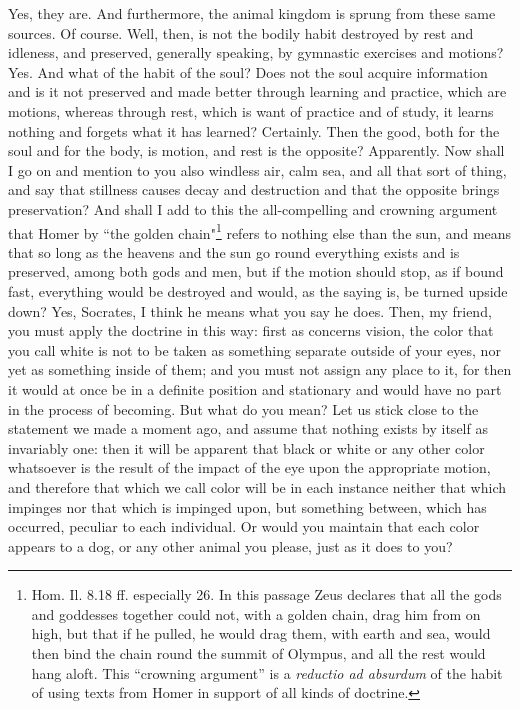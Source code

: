 \documentclass[letterpaper,12pt]{article}
\newcommand{\stephpag}[1]{\marginnote{\small\itshape\fontfamily{ppl}\selectfont #1}}
\begin{document}
\begin{drama}
\theaetetusspeaks
Yes, they are.
\socratesspeaks
And furthermore, the animal kingdom is sprung from these same sources.
\theaetetusspeaks
Of course.
\socratesspeaks
Well, then, is not the bodily habit destroyed by rest and idleness, and preserved, generally speaking, by gymnastic exercises and motions?
\theaetetusspeaks
Yes.
\socratesspeaks
And what of the habit of the soul? Does not the soul acquire information and is it not preserved and made better through learning and practice, which are motions, whereas through rest, which is want of practice and of study, \stephpag{c} it learns nothing and forgets what it has learned?
\theaetetusspeaks
Certainly.
\socratesspeaks
Then the good, both for the soul and for the body, is motion, and rest is the opposite?
\theaetetusspeaks
Apparently.
\socratesspeaks
Now shall I go on and mention to you also windless air, calm sea, and all that sort of thing, and say that stillness causes decay and destruction and that the opposite brings preservation? And shall I add to this the all-compelling and crowning argument that Homer by ``the golden chain"\footnote{Hom. Il. 8.18 ff. especially 26. In this passage Zeus declares that all the gods and goddesses together could not, with a golden chain, drag him from on high, but that if he pulled, he would drag them, with earth and sea, would then bind the chain round the summit of Olympus, and all the rest would hang aloft. This ``crowning argument'' is a \emph{reductio ad absurdum} of the habit of using texts from Homer in support of all kinds of doctrine.} refers to nothing else than the sun, \stephpag{d} and means that so long as the heavens and the sun go round everything exists and is preserved, among both gods and men, but if the motion should stop, as if bound fast, everything would be destroyed and would, as the saying is, be turned upside down?
\theaetetusspeaks
Yes, Socrates, I think he means what you say he does.
\socratesspeaks
Then, my friend, you must apply the doctrine in this way: first as concerns vision, the color that you call white is not to be taken as something separate outside of your eyes, nor yet as something inside of them; and you must not assign any place to it, \stephpag{e} for then it would at once be in a definite position and stationary and would have no part in the process of becoming.
\theaetetusspeaks
But what do you mean?
\socratesspeaks
Let us stick close to the statement we made a moment ago, and assume that nothing exists by itself as invariably one: then it will be apparent that black or white or any other color whatsoever is the result of the impact of the eye upon the appropriate motion, and therefore that which we call color \stephpag{154 a} will be in each instance neither that which impinges nor that which is impinged upon, but something between, which has occurred, peculiar to each individual. Or would you maintain that each color appears to a dog, or any other animal you please, just as it does to you?

\end{drama}
\end{document}
